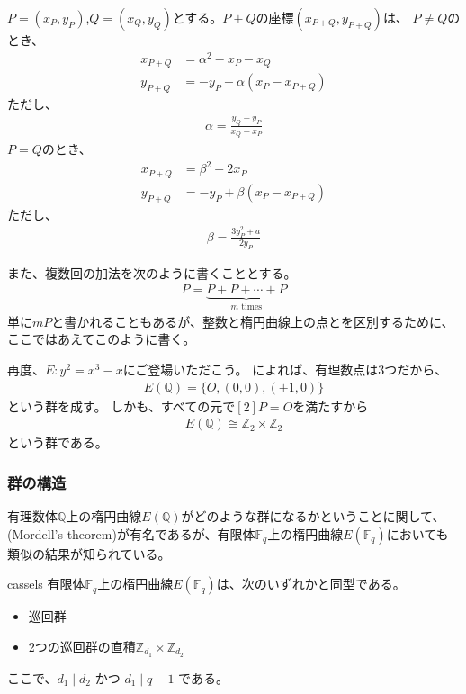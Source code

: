 $P=(x_P,y_P)$,$Q=(x_Q,y_Q)$とする。$P+Q$の座標$(x_{P+Q},y_{P+Q})$は、
$P\neq Q$のとき、
\begin{align*}
x_{P+Q} &= \alpha^2 - x_P - x_Q\\
y_{P+Q} &= -y_P + \alpha(x_P - x_{P+Q})
\end{align*}
ただし、
\begin{align*}
\alpha = \frac{y_Q - y_P}{x_Q - x_P}
\end{align*}
$P=Q$のとき、
\begin{align*}
x_{P+Q} &= \beta^2 - 2x_P\\
y_{P+Q} &= -y_P + \beta(x_P - x_{P+Q})
\end{align*}
ただし、
\begin{align*}
\beta = \frac{3y_P^2 + a}{2y_P}
\end{align*}

また、複数回の加法を次のように書くこととする。
\begin{align*}
[m]P = \underbrace{P+P+\cdots+P }_{m\text{ times}}
\end{align*}
単に$mP$と書かれることもあるが、整数と楕円曲線上の点とを区別するために、ここではあえてこのように書く。

再度、$E:y^2=x^3-x$にご登場いただこう。
によれば、有理数点は3つだから、
\begin{align*}
E(\mathbb{Q}) = \{O, (0,0), (\pm1,0)\}
\end{align*}
という群を成す。
しかも、すべての元で$[2]P=O$を満たすから
\begin{align*}
E(\mathbb{Q}) \cong \mathbb{Z}_2 \times \mathbb{Z}_2
\end{align*}
という群である。

\subsubsection{群の構造}
有理数体$\mathbb{Q}$上の楕円曲線$E(\mathbb{Q})$がどのような群になるかということに関して、(Mordell's theorem)が有名であるが、有限体$\mathbb{F}_q$上の楕円曲線$E(\mathbb{F}_q)$においても類似の結果が知られている。

\begin{Theo}{\cite{Cassels1966DiophantineEW}}{cassels}
有限体$\mathbb{F}_q$上の楕円曲線$E(\mathbb{F}_q)$は、次のいずれかと同型である。
\begin{itemize}
 \item 巡回群
 \item 2つの巡回群の直積$\mathbb{Z}_{d_1}\times\mathbb{Z}_{d_2}$
\end{itemize}
ここで、$d_1 \mid d_2$ かつ $d_1 \mid q - 1$ である。
\end{Theo}

